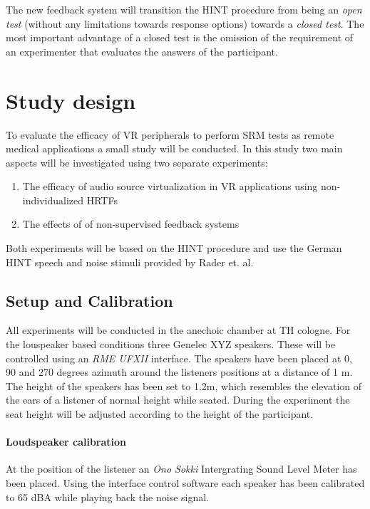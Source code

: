 \documentclass[a4paper,11pt]{article}%
\renewcommand{\\}{\vspace*{0.5\baselineskip} \newline}
\begin{document}
\newline
\newline
The new feedback system will transition the \ac{HINT} procedure from being an \textit{open test} (without any limitations towards response options) towards a \textit{closed test}. The most important advantage of a closed test is the omission of the requirement of an experimenter that evaluates the answers of the participant.


\section{Study design}
To evaluate the efficacy of \ac{VR} peripherals to perform \ac{SRM} tests as remote medical applications a small study will be conducted. In this study two main aspects will be investigated using two separate experiments:
\begin{enumerate}
	\item The efficacy of audio source virtualization in \Ac{VR} applications using non-individualized \ac{HRTF}s
	\item The effects of of non-supervised feedback systems
\end{enumerate}
Both experiments will be based on the \ac{HINT} procedure and use the German \ac{HINT} speech and noise stimuli provided by Rader et. al.


\subsection{Setup and Calibration}
All experiments will be conducted in the anechoic chamber at TH cologne. For the louspeaker based conditions three Genelec XYZ speakers. These will be controlled using an \textit{RME UFXII} interface.
\newline
\newline
The speakers have been placed at 0, 90 and 270 degrees azimuth around the listeners positions at a distance of 1 m. The height of the speakers has been set to 1.2m, which resembles the elevation of the ears of a listener of normal height while seated. During the experiment the seat height will be adjusted according to the height of the participant.


\paragraph{Loudspeaker calibration} At the position of the listener an \textit{Ono Sokki} Intergrating Sound Level Meter has been placed. Using the interface control software each speaker has been calibrated to 65 dBA while playing back the noise signal.
\end{document}
